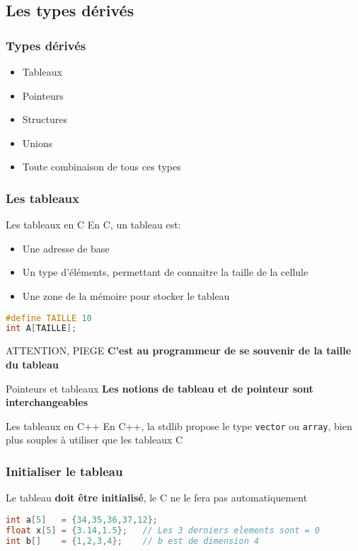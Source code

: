 \documentclass{beamer}
\begin{document}
\subsection{Les types dérivés}

\begin{frame}
\frametitle {Types dérivés}
\begin{itemize}
\item{Tableaux}
\item{Pointeurs}
\item{Structures}
\item{Unions}
\item{Toute combinaison de tous ces types}
\end{itemize}
\end{frame}

\begin{frame}[fragile=singleslide,shrink=20]
\frametitle{Les tableaux}
\begin{block}{Les tableaux en C}
En C, un tableau est:
\begin{itemize}
\item{Une adresse de base}
\item{Un type d'éléments, permettant de connaitre la taille de la cellule}
\item{Une zone de la mémoire pour stocker le tableau}
\end{itemize}
\end{block}
\begin{lstlisting}[language=c++]
#define TAILLE 10
int A[TAILLE];
\end{lstlisting}
\begin{block}{ATTENTION, PIEGE}
\textbf{C'est au programmeur de se souvenir de la taille du tableau}
\end{block}
\begin{block}{Pointeurs et tableaux}
\textbf{Les notions de tableau et de pointeur sont interchangeables}
\end{block}
\begin{block}{Les tableaux en C++}
En C++, la stdlib propose le type \texttt{vector} ou \texttt{array}, bien plus souples à utiliser que les tableaux C
\end{block}
\end{frame}

\begin{frame}[fragile=singleslide,shrink=20]
\frametitle{Initialiser le tableau}
Le tableau \textbf{doit être initialisé}, le C ne le fera pas automatiquement
\begin{lstlisting}[language=c++]
int a[5]   = {34,35,36,37,12};
float x[5] = {3.14,1.5};   // Les 3 derniers elements sont = 0
int b[]    = {1,2,3,4};    // b est de dimension 4
\end{lstlisting}
\end{frame}
\end{document}
